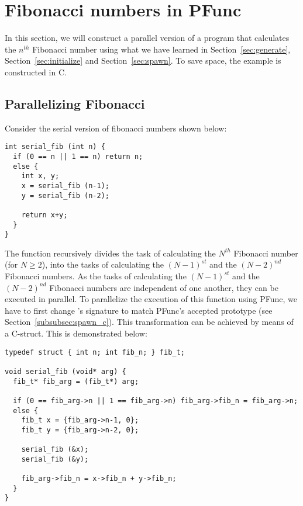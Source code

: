 \section{Fibonacci numbers in PFunc}
\label{sec:fibonacci}

In this section, we will construct a parallel version of a program that
calculates the $n^{th}$ Fibonacci number using what we have learned in
Section~\ref{sec:generate}, Section~\ref{sec:initialize} and
Section~\ref{sec:spawn}. To save space, the example is constructed in C.

\subsection{Parallelizing Fibonacci}
\label{subsec:fib_parallel}

Consider the serial version of fibonacci numbers shown below:

\begin{lstlisting}
int serial_fib (int n) {
  if (0 == n || 1 == n) return n;
  else {
    int x, y;
    x = serial_fib (n-1);
    y = serial_fib (n-2);

    return x+y;
  }
}
\end{lstlisting}

The function  recursively divides the task of calculating the
$N^{th}$ Fibonacci number (for $N \ge 2$), into the tasks of calculating the
$(N-1)^{st}$ and the $(N-2)^{nd}$ Fibonacci numbers.  As the tasks of
calculating the $(N-1)^{st}$ and the $(N-2)^{nd}$ Fibonacci numbers are
independent of one another, they can be executed in parallel. To parallelize
the execution of this function using PFunc, we have to first change
's signature to match PFunc's accepted 
prototype (see Section~\ref{subsubsec:spawn_c}). This transformation can be
achieved by means of a C-struct. This is demonstrated below:

\begin{lstlisting}
typedef struct { int n; int fib_n; } fib_t;

void serial_fib (void* arg) {
  fib_t* fib_arg = (fib_t*) arg;

  if (0 == fib_arg->n || 1 == fib_arg->n) fib_arg->fib_n = fib_arg->n;
  else {
    fib_t x = {fib_arg->n-1, 0};
    fib_t y = {fib_arg->n-2, 0};

    serial_fib (&x);
    serial_fib (&y);

    fib_arg->fib_n = x->fib_n + y->fib_n;
  }
}
\end{lstlisting}

